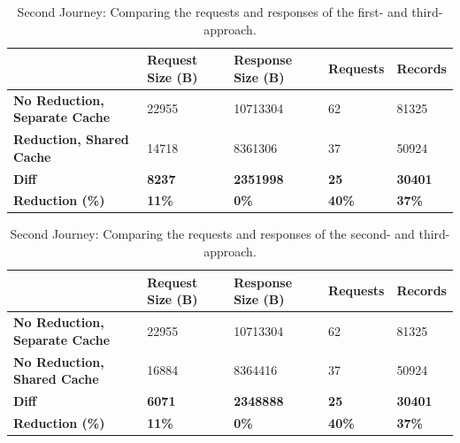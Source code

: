 \ifshowTables
\begin{table}[H]
  \begin{tabular}{|l|l|l|l|l|}
  \hline
  & \textbf{Request Size (B)} & \textbf{Response Size (B)} & \textbf{Requests} & \textbf{Records} \\
  \hline
  \textbf{No Reduction, Separate Cache} & 22955 & 10713304 & 62 & 81325 \\
  \hline
  \textbf{Reduction, Shared Cache} & 14718 & 8361306 & 37 & 50924 \\
  \hline
  \hline
  \textbf{Diff} & \textbf{8237} & \textbf{2351998} & \textbf{25} & \textbf{30401} \\
  \hline
  \textbf{Reduction (\%)} & \textbf{11\%} & \textbf{0\%} & \textbf{40\%} & \textbf{37\%} \\
  \hline
  \end{tabular}
  \caption{Second Journey: Comparing the requests and responses of the first- and third-approach.}\label{table:results:size-comparison-second-path-no-cache-no-reduction-cache-reduction}
\end{table}
\fi

\ifshowTables
\begin{table}[H]
  \begin{tabular}{|l|l|l|l|l|}
  \hline
  & \textbf{Request Size (B)} & \textbf{Response Size (B)} & \textbf{Requests} & \textbf{Records} \\
  \hline
  \textbf{No Reduction, Separate Cache} & 22955 & 10713304 & 62 & 81325 \\
  \hline
  \textbf{No Reduction, Shared Cache} & 16884 & 8364416 & 37 & 50924 \\
  \hline
  \hline
  \textbf{Diff} & \textbf{6071} & \textbf{2348888} & \textbf{25} & \textbf{30401} \\
  \hline
  \textbf{Reduction (\%)} & \textbf{11\%} & \textbf{0\%} & \textbf{40\%} & \textbf{37\%} \\
  \hline
  \end{tabular}
  \caption{Second Journey: Comparing the requests and responses of the second- and third-approach.}\label{table:results:size-comparison-second-path-cache-no-reduction-cache-reduction}
\end{table}
\fi